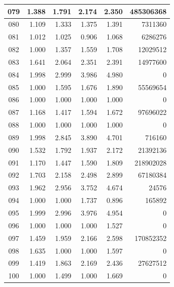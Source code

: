 \begin{longtable}{|c|r|r|r|r|r|}
\hline
079 & 1.388 & 1.791 & 2.174 & 2.350 & 485306368 \\
\hline
080 & 1.109 & 1.333 & 1.375 & 1.391 & 7311360 \\
\hline
081 & 1.012 & 1.025 & 0.906 & 1.068 & 6286276 \\
\hline
082 & 1.000 & 1.357 & 1.559 & 1.708 & 12029512 \\
\hline
083 & 1.641 & 2.064 & 2.351 & 2.391 & 14977600 \\
\hline
084 & 1.998 & 2.999 & 3.986 & 4.980 & 0 \\
\hline
085 & 1.000 & 1.595 & 1.676 & 1.890 & 55569654 \\
\hline
086 & 1.000 & 1.000 & 1.000 & 1.000 & 0 \\
\hline
087 & 1.168 & 1.417 & 1.594 & 1.672 & 97696022 \\
\hline
088 & 1.000 & 1.000 & 1.000 & 1.000 & 0 \\
\hline
089 & 1.998 & 2.845 & 3.890 & 4.701 & 716160 \\
\hline
090 & 1.532 & 1.792 & 1.937 & 2.172 & 21392136 \\
\hline
091 & 1.170 & 1.447 & 1.590 & 1.809 & 218902028 \\
\hline
092 & 1.703 & 2.158 & 2.498 & 2.899 & 67180384 \\
\hline
093 & 1.962 & 2.956 & 3.752 & 4.674 & 24576 \\
\hline
094 & 1.000 & 1.000 & 1.737 & 0.896 & 165892 \\
\hline
095 & 1.999 & 2.996 & 3.976 & 4.954 & 0 \\
\hline
096 & 1.000 & 1.000 & 1.000 & 1.527 & 0 \\
\hline
097 & 1.459 & 1.959 & 2.166 & 2.598 & 170852352 \\
\hline
098 & 1.635 & 1.000 & 1.000 & 1.597 & 0 \\
\hline
099 & 1.419 & 1.863 & 2.169 & 2.436 & 27627512 \\
\hline
100 & 1.000 & 1.499 & 1.000 & 1.669 & 0 \\
\hline
\end{longtable}
\normalsize
\renewcommand{\arraystretch}{1.2}
